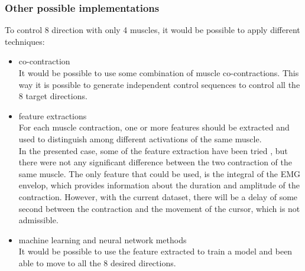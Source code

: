 \documentclass{article}
\begin{document}
	\subsubsection*{Other possible implementations}
	To control 8 direction with only 4 muscles, it would be possible to apply different techniques:
	\begin{itemize}
		\item co-contraction\\
			It would be possible to use some combination of muscle co-contractions. This way it is possible to generate independent control sequences to control all the 8 target directions.
		\item feature extractions\\
			For each muscle contraction, one or more features should be extracted and used to distinguish among different activations of the same muscle.\\
			In the presented case, some of the feature extraction have been tried \cite{emgFeatures}, but there were not any significant difference between the two contraction of the same muscle. The only feature that could be used, is the integral of the EMG envelop, which provides information about the duration and amplitude of the contraction. However, with the current dataset, there will be a delay of some second between the contraction and the movement of the cursor, which is not admissible.
		\item machine learning and neural network methods\\
			It would be possible to use the feature extracted to train a model and been able to move to all the 8 desired directions.
	\end{itemize}

\printbibliography
\end{document}
